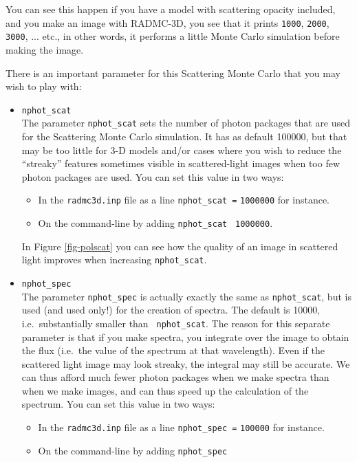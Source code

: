 \documentclass{report}
\begin{document}
You can see this happen if you have a model with scattering opacity
included, and you make an image with RADMC-3D, you see that it prints
{\small\tt 1000}, {\small\tt 2000}, {\small\tt 3000}, ... etc., in other
words, it performs a little Monte Carlo simulation before making the
image.

There is an important parameter for this Scattering Monte Carlo that you
may wish to play with:
\begin{itemize}
\item {\small\tt nphot\_scat}\\
  The parameter {\small\tt nphot\_scat} sets the number of photon packages
  that are used for the Scattering Monte Carlo simulation. It has as default
  100000, but that may be too little for 3-D models and/or cases where you
  wish to reduce the ``streaky'' features sometimes visible in
  scattered-light images when too few photon packages are used. You can
  set this value in two ways:
  \begin{itemize}
    \item In the {\small\tt radmc3d.inp} file as a line {\small\tt nphot\_scat =}
      {\small\tt 1000000} for instance.
    \item On the command-line by adding {\small\tt nphot\_scat} {\small\tt 
        1000000}. 
  \end{itemize}
  In Figure \ref{fig-polscat} you can see how the quality of an image in 
  scattered light improves when increasing {\small\tt nphot\_scat}.
\item {\small\tt nphot\_spec}\\
  The parameter {\small\tt nphot\_spec} is actually exactly the same as
  {\small\tt nphot\_scat}, but is used (and used only!) for the creation of
  spectra. The default is 10000, i.e.~substantially smaller than {\small\tt
    nphot\_scat}. The reason for this separate parameter is that if you make
  spectra, you integrate over the image to obtain the flux (i.e.~the value of
  the spectrum at that wavelength). Even if the scattered light image may
  look streaky, the integral may still be accurate. We can thus afford much
  fewer photon packages when we make spectra than when we make images, and
  can thus speed up the calculation of the spectrum. You can set this value
  in two ways:
  \begin{itemize}
    \item In the {\small\tt radmc3d.inp} file as a line {\small\tt nphot\_spec =}
      {\small\tt 100000} for instance.
    \item On the command-line by adding {\small\tt nphot\_spec} {\small\tt 
}
\end{itemize}
\end{itemize}
\end{document}
